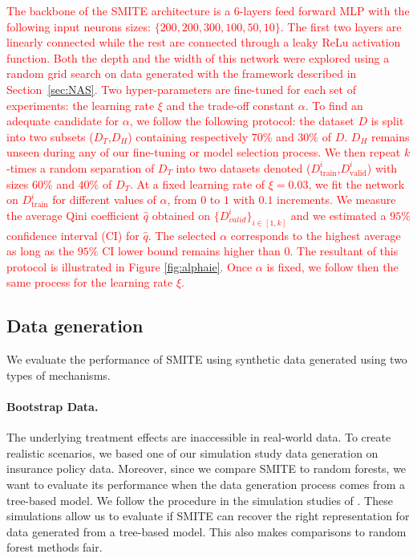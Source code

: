 \documentclass{article}
\begin{document}
\textcolor{red}{The backbone of the SMITE architecture is a $6$-layers feed forward MLP with the following input neurons sizes: $\{200,200,300,100,50,10\}$. The first two layers are linearly connected while the rest are connected through a leaky ReLu activation function. Both the depth and the width of this network were explored using a random grid search on data generated with the framework described in Section~\ref{sec:NAS}. Two hyper-parameters are fine-tuned for each set of experiments: the learning rate $\xi$ and the trade-off constant $\alpha$. To find an adequate candidate for $\alpha$, we follow the following protocol: the dataset $D$ is split into two subsets ($D_T$,$D_H$) containing respectively $70\%$ and $30\%$ of $D$. $D_H$ remains unseen during any of our fine-tuning or model selection process. We then repeat $k$-times a random separation of $D_T$ into two datasets denoted ($D^{i}_{\mathrm{train}}$,$D^{i}_{\mathrm{valid}}$) with sizes $60\%$ and $40\%$ of $D_T$. At a fixed learning rate of $\xi=0.03$, we fit the network on $D^{i}_{\mathrm{train}}$ for different values of $\alpha$, from $0$ to $1$ with $0.1$ increments. We measure the average Qini coefficient $\hat q$ obtained on $\{D^{i}_{valid}\}_{i \in [1,k]}$ and we estimated a $95\%$ confidence interval (CI) for $\hat q$. The selected $\alpha$ corresponds to the highest average as long as the $95\%$ CI lower bound remains higher than $0$. The resultant of this protocol is illustrated in Figure \ref{fig:alphaie}. Once $\alpha$ is fixed, we follow then the same process for the learning rate $\xi$.}




\subsection{Data generation}

We evaluate the performance of SMITE using synthetic data generated using two types of mechanisms.

\paragraph{Bootstrap Data.} The underlying treatment effects are inaccessible in real-world data. To create realistic scenarios, we based one of our simulation study data generation on insurance policy data. Moreover, since we compare SMITE to random forests, we want to evaluate its performance when the data generation process comes from a tree-based model. We follow the procedure in the simulation studies of \cite{belba2019qbased}. These simulations allow us to evaluate if SMITE can recover the right representation for data generated from a tree-based model. This also makes comparisons to random forest methods fair.
\end{document}
